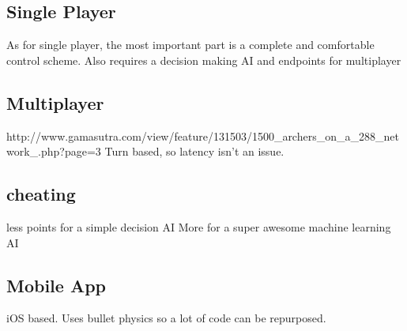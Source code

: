 \documentclass[a4paper,12pt]{article}
\begin{document}
\subsection{Single Player}
As for single player, the most important part is a complete and comfortable control scheme. Also requires a decision making AI and endpoints for multiplayer

\subsection{Multiplayer}
http://www.gamasutra.com/view/feature/131503/1500_archers_on_a_288_network_.php?page=3
Turn based, so latency isn't an issue. 

 \subsection{cheating}
less points for a simple decision AI 
More for a super awesome machine learning AI

\subsection{Mobile App}
iOS based. Uses bullet physics so a lot of code can be repurposed.
 
\end{document}
